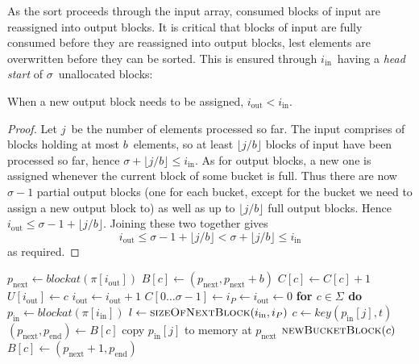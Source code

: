 \documentclass[nolineno,a4paper,UKenglish,cleveref, autoref, thm-restate]{socg-lipics-v2021}
\def\blockat{\textit{blockat}}
\def\key{\textit{key}}
\begin{document}
As the sort proceeds through the input array, consumed blocks of input are reassigned into
output blocks.  It is critical that blocks of input are fully consumed before they are reassigned
into output blocks, lest elements are overwritten before they can be sorted.  This is ensured
through $i_{\mathrm{in}}$~having a \emph{head start} of $\sigma$~unallocated blocks:

\begin{lemma}
When a new output block needs to be assigned, $i_{\mathrm{out}}<i_{\mathrm{in}}$.
\end{lemma}
\begin{proof}
Let $j$~be the number of elements processed so far.
The input comprises of blocks holding at most $b$~elements, so at least
$\lfloor j/b\rfloor$ blocks of input have been processed so far, hence
$\sigma+\lfloor j/b\rfloor\le i_{\mathrm{in}}$.
As for output blocks, a new one is assigned whenever the current block of some bucket
is full.  Thus there are now $\sigma-1$ partial output blocks (one for
each bucket, except for the bucket we need to assign a new output block to)
as well as up to $\lfloor j/b\rfloor$ full output blocks.  Hence
$i_{\mathrm{out}}\le\sigma-1+\lfloor j/b\rfloor$.  Joining these two
together gives
\begin{equation}
i_{\mathrm{out}}\le\sigma-1+\lfloor j/b\rfloor<\sigma+\lfloor j/b\rfloor\le i_{\mathrm{in}}
\end{equation}
as required.
\end{proof}

\begin{algorithm}
\caption{sort phase}\label{alg:sortphase}
\begin{algorithmic}[1]
 \State$p_{\mathrm{next}}\gets\blockat(\pi[i_{\mathrm{out}}])$
 \State$B[c]\gets(p_{\mathrm{next}},p_{\mathrm{next}}+b)$
 \State$C[c]\gets C[c]+1$
 \State$U[i_{\mathrm{out}}]\gets c$
 \State$i_{\mathrm{out}}\gets i_{\mathrm{out}}+1$
\EndProcedure
{}
\State$C[0\ldots\sigma-1]\gets i_P\gets i_{\mathrm{out}}\gets0$
\State\textbf{for $c\in\Sigma$ do} 
 \State$p_{\mathrm{in}}\gets\blockat(\pi[i_{\mathrm{in}}])$
 \State$l\gets\Call{sizeOfNextBlock}{i_{\mathrm{in}},i_P}$
  \State$c\gets\key(p_{\mathrm{in}}[j],t)$
  \State$(p_{\mathrm{next}},p_{\mathrm{end}})\gets B[c]$
  \State copy $p_{\mathrm{in}}[j]$ to memory at $p_{\mathrm{next}}$ \label{stmt:elemwrite}
   \State$\Call{newBucketBlock}{c}$
  \Else
   \State$B[c]\gets(p_{\mathrm{next}}+1,p_{\mathrm{end}})$
  \EndIf
 \EndFor
\EndFor
\EndProcedure
\end{algorithmic}
\end{algorithm}
\end{document}
